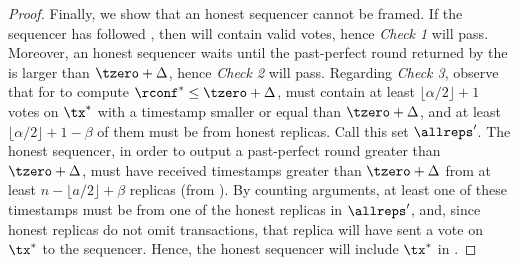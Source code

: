 \begin{proof}
    \noindent
    Finally, we show that an honest sequencer cannot be framed.
    If the sequencer has followed , then \bidcert will contain valid votes, hence \emph{Check 1} will pass.
    Moreover, an honest sequencer waits until the past-perfect round returned by the \podtm is larger than $\tzero + \Delta$, hence \emph{Check 2} will pass.
    Regarding \emph{Check 3}, observe that
    for \identifySequencer{} to compute $\rconf^* \leq \tzero+\Delta$, \txcert must contain at least $\lfloor \alpha/2 \rfloor + 1$ votes on $\tx^*$ with a timestamp smaller or equal than $\tzero+\Delta$, and at least $\lfloor \alpha/2 \rfloor + 1 - \beta$ of them must be from honest replicas. Call this set $\allreps'$.
    The honest sequencer, in order to output a past-perfect round greater than $\tzero+\Delta$, must have received timestamps greater than $\tzero+\Delta$ from at least $n - \lfloor a/2 \rfloor + \beta$ replicas (from ).
    By counting arguments, at least one of these timestamps must be from one of the honest replicas in $\allreps'$, and, since honest replicas do not omit transactions, that replica will have sent a vote on $\tx^*$ to the sequencer. Hence, the honest sequencer will include $\tx^*$ in \bag.
\end{proof}


